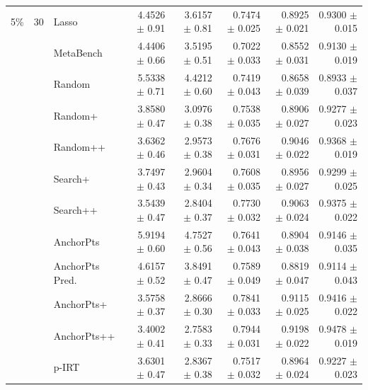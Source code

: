 \begin{longtable}{llp{}rrrrr}
\midrule
5\% & 30 & Lasso & 4.4526 {\scriptsize $\pm$ 0.91} & 3.6157 {\scriptsize $\pm$ 0.81} & 0.7474 {\scriptsize $\pm$ 0.025} & 0.8925 {\scriptsize $\pm$ 0.021} & 0.9300 {\scriptsize $\pm$ 0.015} \\
 &  & MetaBench & 4.4406 {\scriptsize $\pm$ 0.66} & 3.5195 {\scriptsize $\pm$ 0.51} & 0.7022 {\scriptsize $\pm$ 0.033} & 0.8552 {\scriptsize $\pm$ 0.031} & 0.9130 {\scriptsize $\pm$ 0.019} \\
 &  & Random & 5.5338 {\scriptsize $\pm$ 0.71} & 4.4212 {\scriptsize $\pm$ 0.60} & 0.7419 {\scriptsize $\pm$ 0.043} & 0.8658 {\scriptsize $\pm$ 0.039} & 0.8933 {\scriptsize $\pm$ 0.037} \\
 &  & Random+ & 3.8580 {\scriptsize $\pm$ 0.47} & 3.0976 {\scriptsize $\pm$ 0.38} & 0.7538 {\scriptsize $\pm$ 0.035} & 0.8906 {\scriptsize $\pm$ 0.027} & 0.9277 {\scriptsize $\pm$ 0.023} \\
 &  & Random++ & 3.6362 {\scriptsize $\pm$ 0.46} & 2.9573 {\scriptsize $\pm$ 0.38} & 0.7676 {\scriptsize $\pm$ 0.031} & 0.9046 {\scriptsize $\pm$ 0.022} & 0.9368 {\scriptsize $\pm$ 0.019} \\
 &  & Search+ & 3.7497 {\scriptsize $\pm$ 0.43} & 2.9604 {\scriptsize $\pm$ 0.34} & 0.7608 {\scriptsize $\pm$ 0.035} & 0.8956 {\scriptsize $\pm$ 0.027} & 0.9299 {\scriptsize $\pm$ 0.025} \\
 &  & Search++ & 3.5439 {\scriptsize $\pm$ 0.47} & 2.8404 {\scriptsize $\pm$ 0.37} & 0.7730 {\scriptsize $\pm$ 0.032} & 0.9063 {\scriptsize $\pm$ 0.024} & 0.9375 {\scriptsize $\pm$ 0.022} \\
 &  & AnchorPts & 5.9194 {\scriptsize $\pm$ 0.60} & 4.7527 {\scriptsize $\pm$ 0.56} & 0.7641 {\scriptsize $\pm$ 0.043} & 0.8904 {\scriptsize $\pm$ 0.038} & 0.9146 {\scriptsize $\pm$ 0.035} \\
 &  & AnchorPts Pred. & 4.6157 {\scriptsize $\pm$ 0.52} & 3.8491 {\scriptsize $\pm$ 0.47} & 0.7589 {\scriptsize $\pm$ 0.049} & 0.8819 {\scriptsize $\pm$ 0.047} & 0.9114 {\scriptsize $\pm$ 0.043} \\
 &  & AnchorPts+ & 3.5758 {\scriptsize $\pm$ 0.37} & 2.8666 {\scriptsize $\pm$ 0.30} & 0.7841 {\scriptsize $\pm$ 0.033} & 0.9115 {\scriptsize $\pm$ 0.025} & 0.9416 {\scriptsize $\pm$ 0.022} \\
 &  & AnchorPts++ & 3.4002 {\scriptsize $\pm$ 0.41} & 2.7583 {\scriptsize $\pm$ 0.33} & 0.7944 {\scriptsize $\pm$ 0.031} & 0.9198 {\scriptsize $\pm$ 0.022} & 0.9478 {\scriptsize $\pm$ 0.019} \\
 &  & p-IRT & 3.6301 {\scriptsize $\pm$ 0.47} & 2.8367 {\scriptsize $\pm$ 0.38} & 0.7517 {\scriptsize $\pm$ 0.032} & 0.8964 {\scriptsize $\pm$ 0.024} & 0.9227 {\scriptsize $\pm$ 0.023} \\

\end{longtable}
